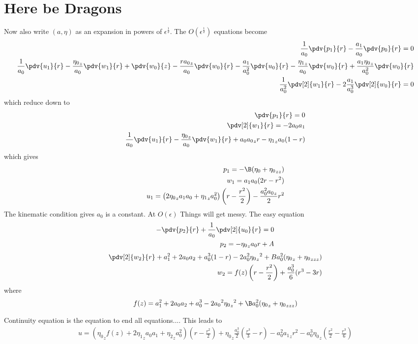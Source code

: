 \documentclass[12pt]{article}
\newcommand{\rt}{^{\frac{1}{2}}}
\begin{document}
\section{Here be Dragons}
Now also write $(a,\eta)$ as an expansion in powers of $\epsilon\rt$. 
The $O(\epsilon\rt)$ equations become
\begin{align}
	\frac{1}{a_0}\pdv{p_1}{r}-\frac{a_1}{a_0}\pdv{p_0}{r} = 0\\
\frac{1}{a_0}\pdv{u_1}{r}-\frac{{\eta_0}_z}{a_0}\pdv{w_1}{r}+ \pdv{w_0}{z}-\frac{r {a_0}_z}{a_0}\pdv{w_0}{r}-\frac{a_1}{a_0^2}\pdv{u_0}{r}-\frac{{\eta_{1}}_z}{a_0}\pdv{w_0}{r}+\frac{a_1{\eta_0}_z}{a_0^2}\pdv{w_0}{r}\\
 \frac{1}{a_0^2}\pdv[2]{w_1}{r}-2\frac{a_1}{a_0^3}\pdv[2]{w_0}{r}=0
\end{align}
which reduce down to 
\begin{align}
\pdv{p_1}{r}=0\\
\pdv[2]{w_1}{r}= -2a_0a_1\\
\frac{1}{a_0}\pdv{u_1}{r}-\frac{{\eta_0}_z}{a_0}\pdv{w_1}{r}+a_0{a_0}_z r-{\eta_1}_za_0(1-r)
\end{align}
which gives
\begin{align}
p_1 = -\B({\eta_0}+{\eta_0}_{zz})\\
w_1 = a_1a_0(2r - r^2) \\
u_1 = \left(2{\eta_0}_za_1a_0+{\eta_1}_za_0^2\right)\left(r-\frac{r^2}{2}\right) -\frac{a_0^2{a_0}_z}{2}r^2
\end{align}
The kinematic condition gives $a_0$ is a constant.
At $O(\epsilon)$ Things will get messy.
The easy equation
\begin{align}
-\pdv{p_2}{r}+\frac{1}{a_0}\pdv[2]{u_0}{r} = 0\\
p_2 = -{\eta_0}_za_0 r +A
\end{align}
\begin{align}
\pdv[2]{w_2}{r}+a_1^2+2a_0a_2+a_0^3(1-r)-2a_0^2{{\eta_0}_z}^2+ Ba_0^2({\eta_0}_z+{\eta_{0}}_{zzz})\\
w_2 = f(z)\left(r-\frac{r^2}{2}\right)+\frac{a_0^3}{6}(r^3-3r)
\end{align}
where
\begin{align}
f(z) =a_1^2+2a_0a_2+a_0^3 -2{a_0}^2{{\eta_0}_{z}}^2+\B a_0^2({\eta_0}_z+{\eta_0}_{zzz})
\end{align}

Continuity equation is the equation to end all equations....
This leads to 
\begin{align}
u = \left({\eta_0}_zf(z)+2{\eta_1}_za_0a_1+{\eta_2}_za_0^2\right)\left(r-\frac{r^2}{2}\right)+{\eta_0}_z\frac{a_0^3}{2}\left(\frac{r^3}{3} - r\right)-a_0^2{a_1}_zr^2-a_0^3{\eta_0}_z\left(\frac{r^2}{2}-\frac{r^3}{6}\right)
\end{align}
\end{document}

